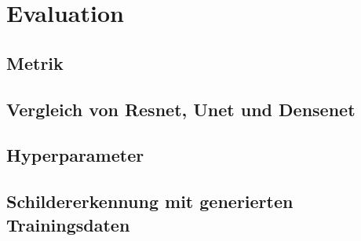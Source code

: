 \chapter{Evaluation}

\label{chap:Evaluation}

\section{Metrik}
\section{Vergleich von Resnet, Unet und Densenet}
\section{Hyperparameter}
\section{Schildererkennung mit generierten Trainingsdaten}